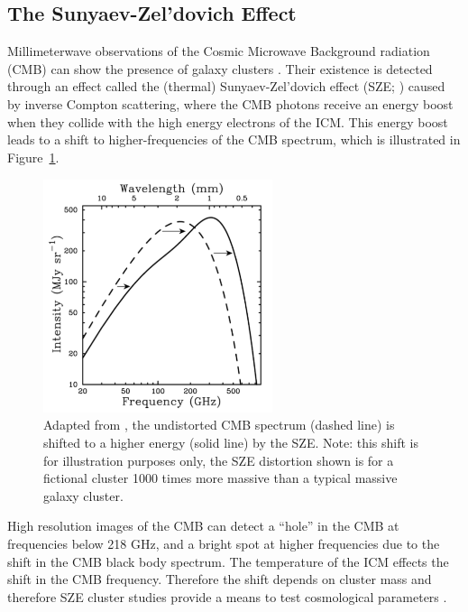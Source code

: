 \subsection{The Sunyaev-Zel'dovich Effect}
Millimeterwave observations of the Cosmic Microwave Background radiation (CMB) can show the presence of galaxy clusters . Their existence is detected through an effect called the (thermal) Sunyaev-Zel'dovich effect (SZE; \citealt{Sunyaev1972}) caused by inverse Compton scattering, where the CMB photons receive an energy boost when they collide with the high energy electrons of the ICM. This energy boost leads to a shift to higher-frequencies of the CMB spectrum, which is illustrated in Figure~\ref{fig:sze}. 
\begin{figure}[ht]
	\begin{center}
		\includegraphics[width=0.6\textwidth]{figures/sze.pdf}
	\end{center}
	\caption[The Sunyaev-Zel'dovich Effect.]{Adapted from \cite{Carlstrom2002a}, the undistorted CMB spectrum (dashed line) is shifted to a higher energy (solid line) by the SZE. Note: this shift is for illustration purposes only, the SZE distortion shown is for a fictional cluster 1000 times more massive than a typical massive galaxy cluster.}
	\label{fig:sze}
\end{figure}
High resolution images of the CMB can detect a ``hole'' in the CMB at frequencies below 218 GHz, and a bright spot at higher frequencies due to the shift in the CMB black body spectrum. The temperature of the ICM effects the shift in the CMB frequency. Therefore the shift depends on cluster mass and therefore SZE cluster studies provide a means to test cosmological parameters . 

